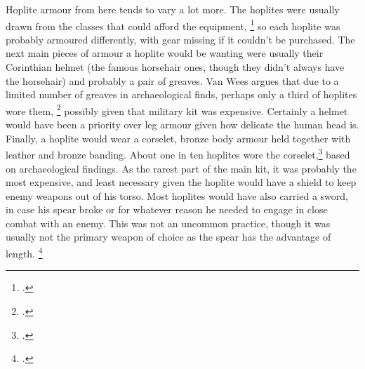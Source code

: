 \documentclass[twoside, a4paper, 12pt]{article}
\begin{document}
\par\vspace{1em}

Hoplite armour from here tends to vary a lot more. The hoplites
were usually drawn from the classes that could afford the 
equipment, \footcite[38]{wietzel_wheeler_1970}
so each hoplite was probably armoured differently, with gear
missing if it couldn't be purchased. The next main pieces of armour a hoplite
would be wanting were usually their Corinthian helmet (the famous horsehair
ones, though they didn't always have the horsehair) and probably a pair of greaves.
Van Wees argues that due to a limited number of greaves in archaeological finds,
perhaps only a third of hoplites wore them, \footcite[50]{wees_2004} possibly given
that military kit was expensive. Certainly a helmet would have been a priority
over leg armour given how delicate the human head is. Finally, a hoplite would
wear a corselet, bronze body armour held together with leather and bronze banding.
About one in ten hoplites wore the corselet,\footcite{wees_1997} based on
archaeological findings. As the rarest part of the main kit,
it was probably the most expensive, and least necessary given the
hoplite would have a shield to keep enemy weapons out of his torso. Most hoplites
would have also carried a sword, in case his spear broke or for whatever reason
he needed to engage in close combat with an enemy. This was not an uncommon
practice, though it was usually not the primary weapon of choice as the spear
has the advantage of length. \footcite{snodgrass_2006}

\par\vspace{1em}
\end{document}
